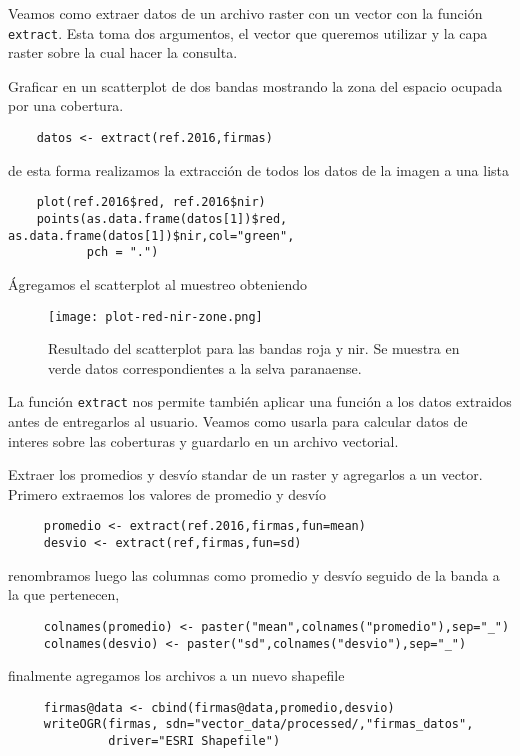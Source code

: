 Veamos como extraer datos de un archivo raster con un vector con la funci\'on
\texttt{extract}. Esta toma dos argumentos, el vector que queremos
utilizar y la capa raster sobre la cual hacer la consulta.

\begin{exa}
    Graficar en un scatterplot de dos bandas mostrando la zona del espacio
    ocupada por una cobertura.
    \begin{lstlisting}
    datos <- extract(ref.2016,firmas)
    \end{lstlisting}
    de esta forma realizamos la extracci\'on de todos los datos de la imagen a una
    lista
    \begin{lstlisting}
    plot(ref.2016$red, ref.2016$nir)
    points(as.data.frame(datos[1])$red, as.data.frame(datos[1])$nir,col="green",
           pch = ".")
    \end{lstlisting}
    Ágregamos el scatterplot al muestreo obteniendo
    \begin{figure}[h!]
    \begin{center}
        \texttt{[image: plot-red-nir-zone.png]}
    \end{center}
    \caption{Resultado del scatterplot para las bandas roja y nir. Se muestra en
        verde datos correspondientes a la selva paranaense.}
    \label{fig:rednirzone}
    \end{figure}

\end{exa}

La funci\'on \texttt{extract} nos permite tambi\'en aplicar una funci\'on a los datos
extraidos antes de entregarlos al usuario. Veamos como usarla para calcular
datos de interes sobre las coberturas y guardarlo en un archivo vectorial.

\begin{exa}
     Extraer los promedios y desv\'io standar de un raster y agregarlos a un
     vector. Primero extraemos los valores de promedio y desv\'io
     \begin{lstlisting}
     promedio <- extract(ref.2016,firmas,fun=mean)
     desvio <- extract(ref,firmas,fun=sd)
     \end{lstlisting}
     renombramos luego las columnas como promedio y desv\'io seguido de la banda a
     la que pertenecen,
     \begin{lstlisting}
     colnames(promedio) <- paster("mean",colnames("promedio"),sep="_")
     colnames(desvio) <- paster("sd",colnames("desvio"),sep="_")
     \end{lstlisting}
     finalmente agregamos los archivos a un nuevo shapefile
     \begin{lstlisting}
     firmas@data <- cbind(firmas@data,promedio,desvio)
     writeOGR(firmas, sdn="vector_data/processed/,"firmas_datos",
              driver="ESRI Shapefile")
     \end{lstlisting}
\end{exa}

